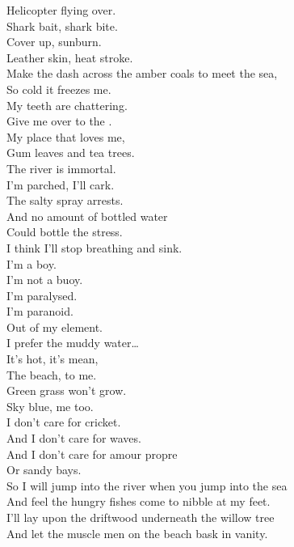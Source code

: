Helicopter flying over. \\
Shark bait, shark bite. \\
Cover up, sunburn. \\
Leather skin, heat stroke. \\

Make the dash across the amber coals to meet the sea, \\
So cold it freezes me. \\
My teeth are chattering. \\
Give me over to the . \\
My place that loves me, \\
Gum leaves and tea trees. \\
The river is immortal. \\

I'm parched, I'll cark. \\
The salty spray arrests. \\
And no amount of bottled water \\
Could bottle the stress. \\
I think I'll stop breathing and sink. \\
I'm a boy. \\
I'm not a buoy. \\
I'm paralysed. \\
I'm paranoid. \\
Out of my element. \\

I prefer the muddy water… \\

It's hot, it's mean, \\
The beach, to me. \\
Green grass won't grow. \\
Sky blue, me too. \\

I don't care for cricket. \\
And I don't care for waves. \\
And I don't care for amour propre \\
Or sandy bays. \\

So I will jump into the river when you jump into the sea \\
And feel the hungry fishes come to nibble at my feet. \\
I'll lay upon the driftwood underneath the willow tree \\
And let the muscle men on the beach bask in vanity. \\

